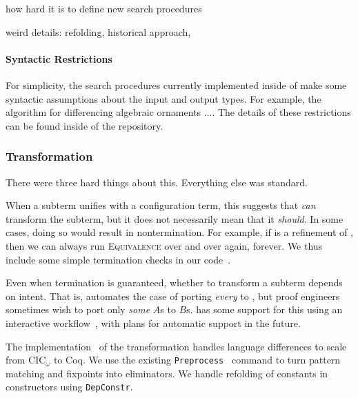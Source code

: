 how hard it is to define new search procedures

weird details: refolding, historical approach, 

\paragraph{Syntactic Restrictions}
For simplicity, the search procedures currently implemented inside of \toolnamec make some syntactic assumptions
about the input and output types.
For example, the algorithm for differencing algebraic ornaments $\ldots$. 
The details of these restrictions can be found inside of the repository. %

\subsubsection{Transformation}
\label{sec:pi-details-trans}

There were three hard things about this.
Everything else was standard.

When a subterm unifies with a configuration term, this suggests that \toolnamec \textit{can}
transform the subterm, but it does not necessarily mean that it \textit{should}.
In some cases, doing so would result in nontermination.
For example, if \B is a refinement of \Aa, then we can always run \textsc{Equivalence}
over and over again, forever.
We thus include some simple termination checks in our code~\href{https://github.com/uwplse/pumpkin-pi/blob/v2.0.0/plugin/src/automation/lift/liftrules.ml}{}. %

Even when termination is guaranteed, whether to transform a subterm depends on intent.
That is, \toolnamec automates the case of porting \textit{every} \Aa to \B,
but proof engineers sometimes wish to port only \textit{some} $A$s to $B$s.
\toolnamec has some support for this using an interactive workflow~\href{https://github.com/uwplse/pumpkin-pi/blob/v2.0.0/plugin/coq/minimal_records.v}{},
with plans for automatic support in the future. %

The implementation~\href{https://github.com/uwplse/pumpkin-pi/blob/v2.0.0/plugin/src/automation/lift/lift.ml}{} %
of the transformation handles language differences to scale from CIC$_{\omega}$ to Coq.
We use the existing \lstinline{Preprocess}~\cite{Ringer2019} command to turn pattern matching and fixpoints into 
eliminators.
We handle refolding of constants in constructors using \lstinline{DepConstr}.

